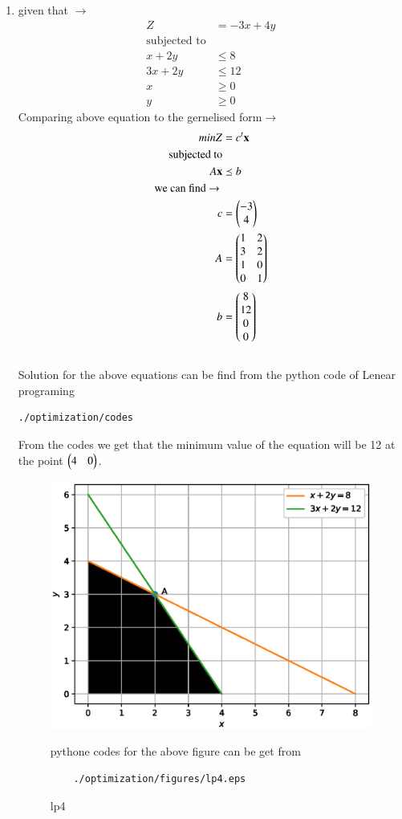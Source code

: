 \renewcommand{\theequation}{\theenumi}
\begin{enumerate}[label=\arabic*.,ref=\thesubsection.\theenumi]
\item given that $\to$
\begin{align}
Z &= -3x + 4y
\\
\text{subjected to}
\\
x + 2y &\leq 8
\\
3x + 2y &\leq 12
\\
x  &\geq 0
\\
y &\geq 0
\end{align}
Comparing above equation to the gernelised form$\to$ 
\begin{align}
minZ &= c^t \mathbf{x}
\\
\text{subjected to}
\\
A\mathbf{x} &\preceq b
\\ 
\text{we can find $\to$ }
\\
c &= \begin{pmatrix}-3\\ 4\end{pmatrix}
\\
A &= \begin{pmatrix}1 & 2 \\ 3 & 2\\1 &0 \\ 0 & 1\end{pmatrix}
\\
b &= \begin{pmatrix}8\\12\\ 0\\ 0\end{pmatrix}
\end{align}\\
Solution for the above equations can be find from the python code of Lenear programing 
\begin{lstlisting}
./optimization/codes
\end{lstlisting}
From the codes we get that the minimum value of the equation will be 12 at the point $\begin{pmatrix}4 & 0\end{pmatrix}$.

\begin{figure}[!ht]
	\centering
	\includegraphics[width=\columnwidth]{./figures/lp4.eps}
	\caption{ lp4 }
	\label{fig:lp4}
	pythone codes for the above figure can be get from
	\begin{lstlisting}
	./optimization/figures/lp4.eps
	\end{lstlisting}	
\end{figure}
\end{enumerate}